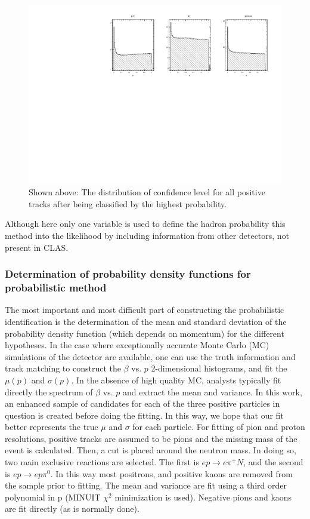 \begin{figure}
  \begin{center}
    \includegraphics[width=14cm]{image/plots/hadron-id/confidence_level.pdf}
    \caption{ Shown above: The distribution of confidence level for all positive tracks after being classified by the highest probability.}
  \end{center}
\end{figure}

Although here only one variable is used to define the hadron probability this method into the likelihood by including information from other detectors, not present in CLAS. 

\subsubsection{Determination of probability density functions for probabilistic method}

The most important and most difficult part of constructing the probabilistic identification is the determination of the mean and standard deviation of the probability density function (which depends on momentum) for the different hypotheses.  In the case where exceptionally accurate Monte Carlo (MC) simulations of the detector are available, one can use the truth information and track matching to construct the $\beta$ vs. $p$ 2-dimensional histograms, and fit the $\mu(p)$ and $\sigma(p)$.  In the absence of high quality MC, analysts typically fit directly the spectrum of $\beta$ vs. $p$ and extract the mean and variance.  In this work, an enhanced sample of candidates for each of the three positive particles in question is created before doing the fitting.  In this way, we hope that our fit better represents the true $\mu$ and $\sigma$ for each particle.  For fitting of pion and proton resolutions, positive tracks are assumed to be pions and the missing mass of the event is calculated.  Then, a cut is placed around the neutron mass.  In doing so, two main exclusive reactions are selected.  The first is $ep \rightarrow e\pi^+N$, and the second is $ep \rightarrow ep\pi^0$.  In this way most positrons, and positive kaons are removed from the sample prior to fitting.  The mean and variance are fit using a third order polynomial in p (MINUIT $\chi^2$ minimization is used).  Negative pions and kaons are fit directly (as is normally done).

